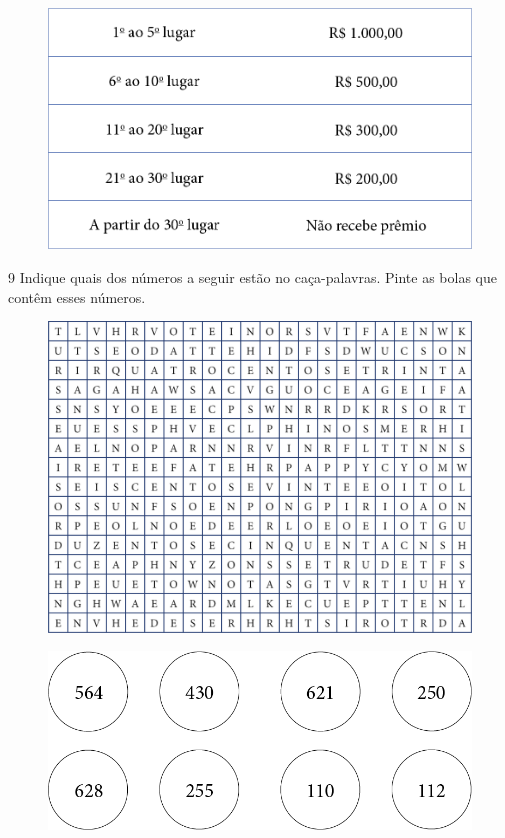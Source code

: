 \begin{figure}[htpb!]
\includegraphics[width=\textwidth]{./media/image10.png}
\end{figure}


\pagebreak
\num{9} Indique quais dos números a seguir estão no caça-palavras. Pinte
as bolas que contêm esses números.

\begin{figure}[htpb!]
\includegraphics[width=\textwidth]{./media/image11.png}
\end{figure}

\begin{figure}[htpb!]
\includegraphics[width=\textwidth]{./media/image12.png}
\end{figure}

